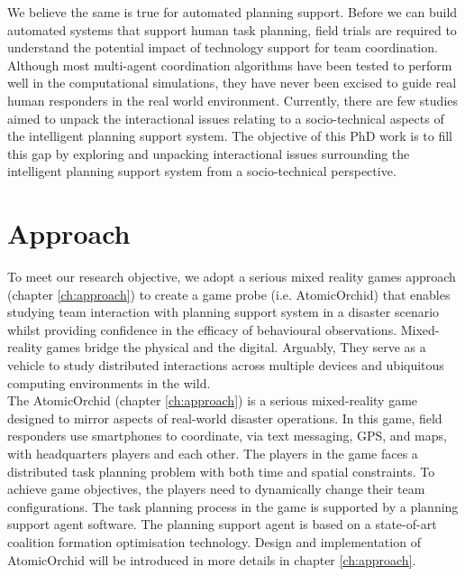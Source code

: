 We believe the same is true for automated planning support. Before we can build automated systems that support human task planning, field trials are required to understand the potential impact of technology support for team coordination. Although most multi-agent coordination algorithms have been tested to perform well in the computational simulations, they have never been excised to guide real human responders in the real world environment. Currently, there are few studies aimed to unpack the interactional issues relating to a socio-technical aspects of the intelligent planning support system. The objective of this PhD work is to fill this gap by exploring and unpacking interactional issues surrounding the intelligent planning support system from a socio-technical perspective.\\

\section{Approach}\label{sec:custom}

To meet our research objective, we adopt a serious mixed reality games approach (chapter \ref{ch:approach}) to create a game probe (i.e. AtomicOrchid) that enables studying team interaction with planning support system in a disaster scenario whilst providing confidence in the efficacy of behavioural observations. Mixed-reality games bridge the physical and the digital. Arguably, They serve as a vehicle to study distributed interactions across multiple devices and ubiquitous computing environments in the wild.\\

The AtomicOrchid (chapter \ref{ch:approach}) is a serious mixed-reality game designed to mirror aspects of real-world disaster operations. In this game, field responders use smartphones to coordinate, via text messaging, GPS, and maps, with headquarters players and each other. The players in the game faces a distributed task planning problem with both time and spatial constraints. To achieve game objectives, the players need to dynamically change their team configurations. The task planning process in the game is supported by a planning support agent software. The planning support agent is based on a state-of-art coalition formation optimisation technology. Design and implementation of AtomicOrchid will be introduced in more details in chapter \ref{ch:approach}.\\

